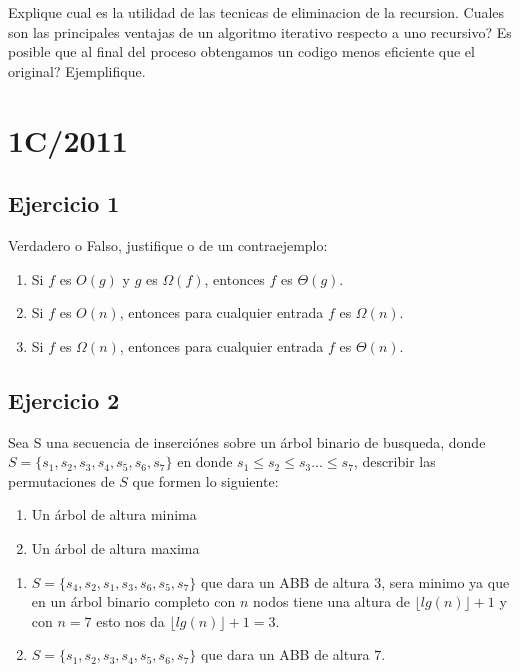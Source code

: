 \documentclass[10pt, a4paper]{report}
\begin{document}
Explique cual es la utilidad de las tecnicas de eliminacion de la recursion. Cuales son las principales ventajas de un algoritmo iterativo respecto a uno recursivo? Es posible que al final del proceso obtengamos un codigo menos eficiente que el original? Ejemplifique.

\newpage
\section{1C/2011}

\subsection*{Ejercicio 1}

Verdadero o Falso, justifique o de un contraejemplo:
\begin{enumerate}
 \item Si $f$ es $O(g)$ y $g$ es $\Omega(f)$, entonces $f$ es $\Theta(g)$.
 \item Si $f$ es $O(n)$, entonces para cualquier entrada $f$ es $\Omega(n)$.
 \item Si $f$ es $\Omega(n)$, entonces para cualquier entrada $f$ es $\Theta(n)$.
\end{enumerate}

\subsection*{Ejercicio 2}

Sea S una secuencia de inserci\'ones sobre un \'arbol binario de busqueda, donde $S = \{ s_1, s_2, s_3, s_4, s_5, s_6, s_7\}$ en donde $s_1 \leq s_2 \leq s_3 ... \leq s_7$, describir las permutaciones de $S$ que formen lo siguiente:
\begin{enumerate}
 \item Un \'arbol de altura minima
 \item Un \'arbol de altura maxima
\end{enumerate}

\begin{enumerate}
 \item $S = \{ s_4, s_2, s_1, s_3, s_6, s_5, s_7\}$ que dara un ABB de altura $3$, sera minimo ya que en un \'arbol binario completo con $n$ nodos tiene una altura de $\lfloor lg(n) \rfloor + 1$ y con $n=7$ esto nos da $\lfloor lg(n) \rfloor + 1 = 3$.
 \item $S = \{ s_1, s_2, s_3, s_4, s_5, s_6, s_7\}$ que dara un ABB de altura $7$.
\end{enumerate}
\end{document}
